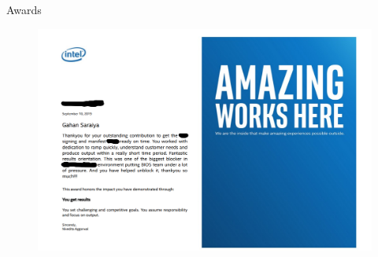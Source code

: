 \begin{frame}{Awards}
    \begin{figure}[htbp]
        \centering
        \includegraphics[width=\linewidth]{Im/figures/award1}
    \end{figure}
\end{frame}